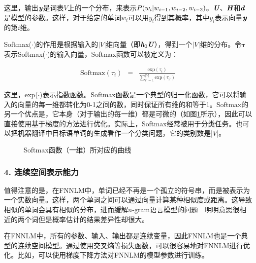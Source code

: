 \noindent  这里，输出$ {\textbf{\em y}}$是词表$V$上的一个分布，来表示${P}(w_i|w_{i-1},w_{i-2},w_{i-3}) $。$ {\textbf{\em U}}$、${\textbf{\em H}}$和${\textbf{\em d}}$是模型的参数。这样，对于给定的单词$w_i$可以用$y_i$得到其概率，其中$y_i$表示向量${\textbf{\em y}}$的第$i$维。

\parinterval Softmax($\cdot$)的作用是根据输入的$|V|$维向量（即${\textbf{\em h}}_0{\textbf{\em U}}$），得到一个$|V|$维的分布。令${\bm \tau}$表示Softmax($\cdot$)的输入向量，Softmax函数可以被定义为：

\begin{eqnarray}
\textrm{Softmax}(\tau_i)&=&\frac{\textrm{exp}(\tau_i)}  {\sum_{i'=1}^{|V|} \textrm{exp}(\tau_{i'})}
\label{eq:9-120}
\end{eqnarray}

\noindent 这里，exp($\cdot$)表示指数函数。Softmax函数是一个典型的归一化函数，它可以将输入的向量的每一维都转化为0-1之间的数，同时保证所有维的和等于1。Softmax的另一个优点是，它本身（对于输出的每一维）都是可微的（如图\ref{fig:softmax}所示），因此可以直接使用基于梯度的方法进行优化。实际上，Softmax经常被用于分类任务。也可以把机器翻译中目标语单词的生成看作一个分类问题，它的类别数是|$V$|。

\begin{figure}[htp]
\centering

\caption{ Softmax函数（一维）所对应的曲线}
\label{fig:softmax}
\end{figure}


\subsubsection{4. 连续空间表示能力}

\parinterval  值得注意的是，在FNNLM中，单词已经不再是一个孤立的符号串，而是被表示为一个实数向量。这样，两个单词之间可以通过向量计算某种相似度或距离。这导致相似的单词会具有相似的分布，进而缓解$n$-gram语言模型的问题\ \dash \ 明明意思很相近的两个词但是概率估计的结果差异性却很大。

\parinterval  在FNNLM中，所有的参数、输入、输出都是连续变量，因此FNNLM也是一个典型的连续空间模型。通过使用交叉熵等损失函数，可以很容易地对FNNLM进行优化。比如，可以使用梯度下降方法对FNNLM的模型参数进行训练。

